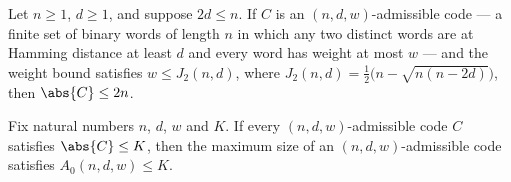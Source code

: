 \begin{theorem}
\label{CodingTheory.Johnson.binary_johnson_card_bound_of_admissible}
\leanok
{}
Let $n \ge 1$, $d \ge 1$, and suppose $2d \le n$. If $C$ is an $(n,d,w)$-admissible code
— a finite set of binary words of length $n$ in which any two distinct words are at
Hamming distance at least $d$ and every word has weight at most $w$ — and the weight
bound satisfies $w \le J_2(n,d)$, where $J_2(n,d) = \tfrac{1}{2}\bigl(n -
\sqrt{n(n-2d)}\bigr)$, then $\abs{C} \le 2n$.
\end{theorem}

\begin{lemma}
\label{A0_le_of_forall_le}
\leanok
{}
Fix natural numbers $n$, $d$, $w$ and $K$. If every $(n,d,w)$-admissible code $C$
satisfies $\abs{C} \le K$, then the maximum size of an $(n,d,w)$-admissible code
satisfies $A_0(n,d,w) \le K$.
\end{lemma}
